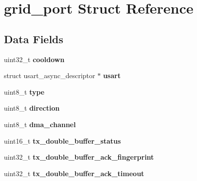 \hypertarget{structgrid__port}{\section{grid\-\_\-port Struct Reference}
\label{structgrid__port}
}
\subsection*{Data Fields}
\begin{DoxyCompactItemize}
\item 
\hypertarget{structgrid__port_ac90f4d7a765476876e7d751f5db25b20}{uint32\-\_\-t {\bfseries cooldown}}\label{structgrid__port_ac90f4d7a765476876e7d751f5db25b20}

\item 
\hypertarget{structgrid__port_aedeba701d74e163555134c289846a507}{struct usart\-\_\-async\-\_\-descriptor $\ast$ {\bfseries usart}}\label{structgrid__port_aedeba701d74e163555134c289846a507}

\item 
\hypertarget{structgrid__port_ae2a4796098cc228b4ad1102d4ff8d2af}{uint8\-\_\-t {\bfseries type}}\label{structgrid__port_ae2a4796098cc228b4ad1102d4ff8d2af}

\item 
\hypertarget{structgrid__port_ad60646467c672320d40903956775c0ec}{uint8\-\_\-t {\bfseries direction}}\label{structgrid__port_ad60646467c672320d40903956775c0ec}

\item 
\hypertarget{structgrid__port_a91c46f032f63fc4939a7eecae5105e81}{uint8\-\_\-t {\bfseries dma\-\_\-channel}}\label{structgrid__port_a91c46f032f63fc4939a7eecae5105e81}

\item 
\hypertarget{structgrid__port_a7ae05944d51b04faf00dea8c1285f3fb}{uint16\-\_\-t {\bfseries tx\-\_\-double\-\_\-buffer\-\_\-status}}\label{structgrid__port_a7ae05944d51b04faf00dea8c1285f3fb}

\item 
\hypertarget{structgrid__port_ae1e93df3f214756bc0676dfcdcfa9513}{uint32\-\_\-t {\bfseries tx\-\_\-double\-\_\-buffer\-\_\-ack\-\_\-fingerprint}}\label{structgrid__port_ae1e93df3f214756bc0676dfcdcfa9513}

\item 
\hypertarget{structgrid__port_a1199247148e717529335f37bd1d0c614}{uint32\-\_\-t {\bfseries tx\-\_\-double\-\_\-buffer\-\_\-ack\-\_\-timeout}}\label{structgrid__port_a1199247148e717529335f37bd1d0c614}


\end{DoxyCompactItemize}
